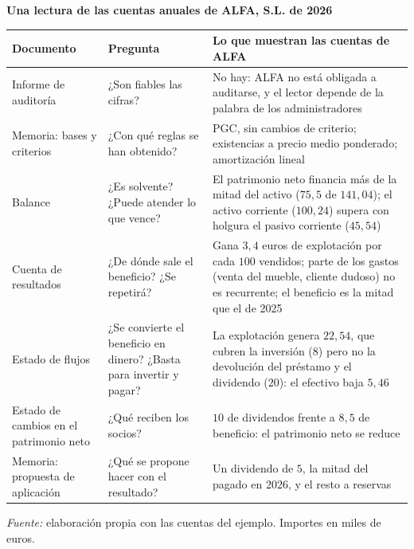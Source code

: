\documentclass[10pt,a4paper]{article}
\begin{document}
\begin{center}\begin{minipage}{\linewidth}\centering
{\small\textbf{Una lectura de las cuentas anuales de ALFA, S.L. de 2026}}\par\vspace{0.3em}
{\footnotesize
\begin{tabular}{p{2.8cm} p{4.5cm} p{7.2cm}}
\hline
\textbf{Documento} & \textbf{Pregunta} & \textbf{Lo que muestran las cuentas de ALFA} \\
\hline
\raggedright Informe de auditoría & \raggedright ¿Son fiables las cifras? & \raggedright No hay: ALFA no está obligada a auditarse, y el lector depende de la palabra de los administradores \tabularnewline
\raggedright Memoria: bases y criterios & \raggedright ¿Con qué reglas se han obtenido? & \raggedright PGC, sin cambios de criterio; existencias a precio medio ponderado; amortización lineal \tabularnewline
\raggedright Balance & \raggedright ¿Es solvente? ¿Puede atender lo que vence? & \raggedright El patrimonio neto financia más de la mitad del activo ($75,5$ de $141,04$); el activo corriente ($100,24$) supera con holgura el pasivo corriente ($45,54$) \tabularnewline
\raggedright Cuenta de resultados & \raggedright ¿De dónde sale el beneficio? ¿Se repetirá? & \raggedright Gana $3,4$ euros de explotación por cada $100$ vendidos; parte de los gastos (venta del mueble, cliente dudoso) no es recurrente; el beneficio es la mitad que el de 2025 \tabularnewline
\raggedright Estado de flujos & \raggedright ¿Se convierte el beneficio en dinero? ¿Basta para invertir y pagar? & \raggedright La explotación genera $22,54$, que cubren la inversión ($8$) pero no la devolución del préstamo y el dividendo ($20$): el efectivo baja $5,46$ \tabularnewline
\raggedright Estado de cambios en el patrimonio neto & \raggedright ¿Qué reciben los socios? & \raggedright $10$ de dividendos frente a $8,5$ de beneficio: el patrimonio neto se reduce \tabularnewline
\raggedright Memoria: propuesta de aplicación & \raggedright ¿Qué se propone hacer con el resultado? & \raggedright Un dividendo de $5$, la mitad del pagado en 2026, y el resto a reservas \tabularnewline
\hline
\end{tabular}}\par\vspace{0.3em}
{\small\textit{Fuente: }elaboración propia con las cuentas del ejemplo. Importes en miles de euros.}
\end{minipage}\end{center}
\end{document}
